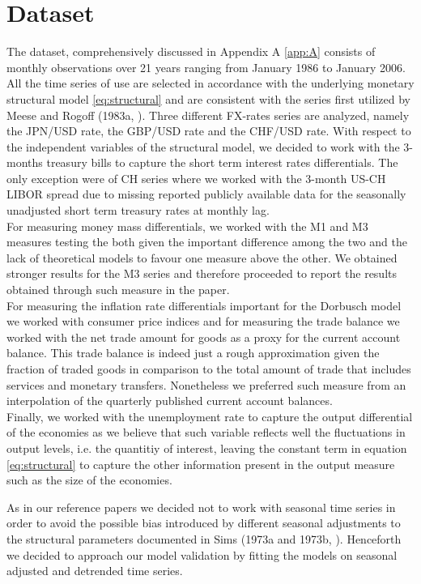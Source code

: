 \section{Dataset} \label{sec:dataset}

The dataset, comprehensively discussed in Appendix A \ref{app:A} consists of
monthly observations over 21 years ranging
from January 1986 to January 2006.
All the time series of use are selected in accordance with the underlying monetary
structural model \ref{eq:structural} and are consistent with the series first utilized by
Meese and Rogoff (1983a, \cite{MeeseRogoffa}). Three different FX-rates series are
analyzed, namely the JPN/USD rate, the GBP/USD rate and the CHF/USD rate.
With respect to the independent variables of the structural model, we decided to work
with the 3-months treasury bills to capture the short term interest rates differentials. The only exception were of CH series where we worked with the 3-month US-CH LIBOR spread
due to missing reported publicly available data for the seasonally unadjusted short term treasury rates at monthly lag.
\\ For measuring money mass differentials,
we worked with the M1 and M3 measures testing the both given the important difference among the two 
and the lack of theoretical models to favour one measure above the other. We obtained stronger results for the M3 series
and therefore proceeded to report the results obtained through such measure in the paper. \\ For measuring the
inflation rate differentials important for the Dorbusch model we worked with consumer price indices and
for measuring the trade balance we worked with the net trade amount for goods as a proxy for the current account balance.
This trade balance is indeed just a rough approximation
given the fraction of traded goods in comparison to the total amount of trade that includes services and monetary transfers.
Nonetheless we preferred such measure from an interpolation of the quarterly published current account balances. \\
Finally, we worked with the unemployment rate to capture the output differential of the economies as we
believe that such variable
reflects well the fluctuations in output levels, i.e. the quantitiy of interest, leaving
the constant term in equation \ref{eq:structural} to capture the other information present
in the output measure such as the size of the economies.

As in our reference papers we decided not to work with seasonal time series in order to avoid
the possible bias introduced by different seasonal 
adjustments to the structural parameters documented in Sims (1973a and 1973b, \cite{Simsa, Simsb}).
Henceforth we decided to approach our model validation by fitting the
models on seasonal adjusted and detrended time series.

